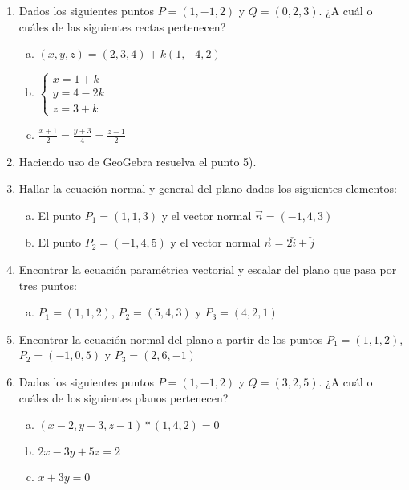 \documentclass[11pt,a4paper]{article}
\begin{document}
\begin{enumerate}
\item Dados los siguientes puntos $P = (1, -1, 2)$ y $Q = (0, 2, 3)$. ¿A cu\'al o cu\'ales de las siguientes rectas pertenecen?

\begin{enumerate}[a)]
\item $(x, y, z) = (2, 3, 4) + k (1, -4, 2)$
\item $\begin{cases}
  x = 1 + k \\
  y = 4 -2 k \\
  z = 3 + k
\end{cases}$
\item $\frac{x + 1}{2} = \frac{y + 3}{4} = \frac{z - 1}{2}$
\end{enumerate}

\item Haciendo uso de GeoGebra resuelva el punto 5).

\item Hallar la ecuaci\'on normal y general del plano dados los siguientes elementos:

\begin{enumerate}[a)]
\item El punto $P_{1} = (1, 1, 3)$ y el vector normal $\vec{n} = (-1, 4, 3)$
\item El punto $P_{2} = (-1, 4, 5)$ y el vector normal $\vec{n} = 2 \check{i} + \check{j}$
\end{enumerate}

\item Encontrar la ecuaci\'on param\'etrica vectorial y escalar del plano que pasa por tres puntos:

\begin{enumerate}[a)]
\item $P_{1} = (1, 1, 2)$, $P_{2} = (5, 4, 3)$ y $P_{3} = (4, 2, 1)$
\end{enumerate}

\item Encontrar la ecuaci\'on normal del plano a partir de los puntos $P_{1} = (1, 1, 2)$, $P_{2} = (-1, 0, 5)$ y $P_{3} = (2, 6, -1)$

\item Dados los siguientes puntos $P = (1, -1, 2)$ y $Q = (3, 2, 5)$. ¿A cu\'al o cu\'ales de los siguientes planos pertenecen? 

\begin{enumerate}[a)]
\item $(x - 2, y + 3, z - 1) * (1, 4, 2) = 0$
\item $2x - 3y + 5z = 2$
\item $x + 3y = 0$
\end{enumerate}


\end{enumerate}
\end{document}
